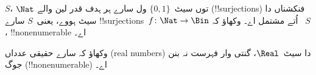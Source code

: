\documentclass[../../../include/open-logic-section]{subfiles}
\begin{document}
\begin{prob}
$S$، $\Nat$ توں سیٹ~$\{0,1\}$ ول سارے ہر ہدف قدر لین والے
(!!{surjection}s) فنکشناں دا سیٹ ہووے، یعنی~$S$ سارے
!!{surjection}s~$f \colon \Nat \to \Bin$ اُتے مشتمل اے۔ وکھاؤ کہ
~$S$، !!{nonenumerable} اے۔
\end{prob}

\begin{prob}
وکھاؤ کہ سارے حقیقی عدداں (real numbers) دا سیٹ~$\Real$، گنتی وار
فہرست نہ بنن جوگ (!!{nonenumerable}) اے۔
\end{prob}
\end{document}
